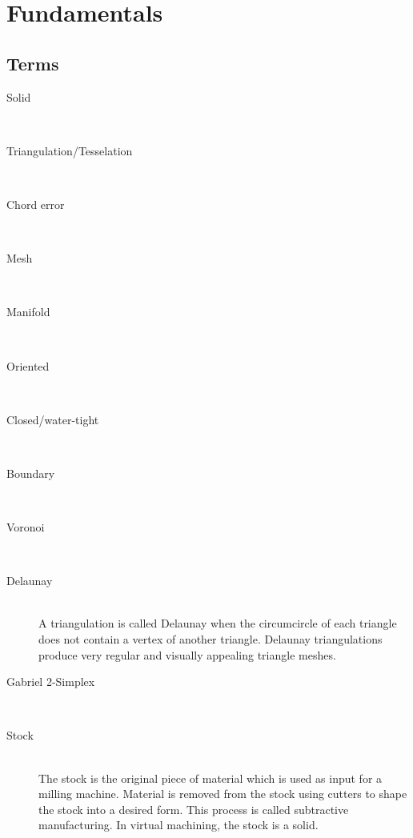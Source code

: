 \chapter{Fundamentals} %
\label{ch:fundamentals}


\section{Terms}
\label{sec:definitions}

\begin{description}
	\item[Solid] \hfill \\
	
	\item[Triangulation/Tesselation] \hfill \\
	
	\item[Chord error] \hfill \\
	
	\item[Mesh] \hfill \\
	
	\item[Manifold] \hfill \\
	
	\item[Oriented] \hfill \\
	
	\item[Closed/water-tight] \hfill \\
	
	\item[Boundary] \hfill \\
	
	\item[Voronoi] \hfill \\
	
	\item[Delaunay] \hfill \\
	A triangulation is called Delaunay when the circumcircle of each triangle does not contain a vertex of another triangle.
	Delaunay triangulations produce very regular and visually appealing triangle meshes.
	
	\item[Gabriel 2-Simplex] \hfill \\
	
	\item[Stock] \hfill \\
	The stock is the original piece of material which is used as input for a milling machine.
	Material is removed from the stock using cutters to shape the stock into a desired form.
	This process is called subtractive manufacturing.
	In virtual machining, the stock is a solid.
	

\end{description}
